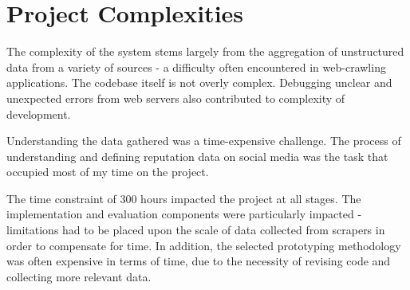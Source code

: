 


\section{Project Complexities}

The complexity of the system stems largely from the aggregation of unstructured data from a variety of sources - a difficulty often encountered in web-crawling applications. The codebase itself is not overly complex. Debugging unclear and unexpected errors from web servers also contributed to complexity of development.


Understanding the data gathered was a time-expensive challenge. The process of understanding and defining reputation data on social media was the task that occupied most of my time on the project. 

The time constraint of 300 hours impacted the project at all stages. The implementation and evaluation components were particularly impacted - limitations had to be placed upon the scale of data collected from scrapers in order to compensate for time. In addition, the selected prototyping methodology was often expensive in terms of time, due to the necessity of revising code and collecting more relevant data.




